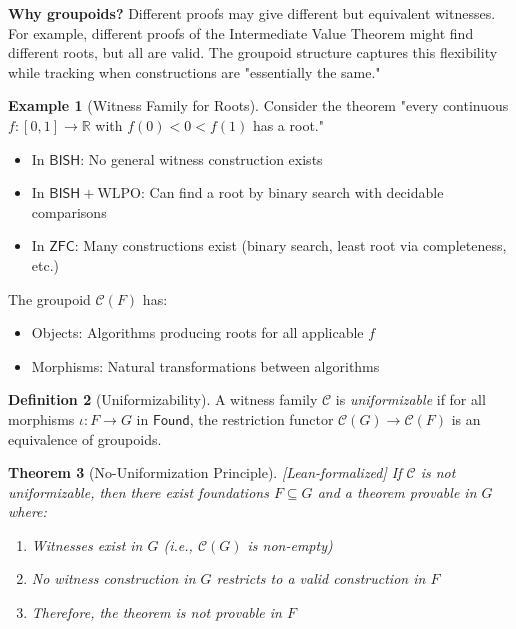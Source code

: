 \documentclass[11pt]{article}
\theoremstyle{plain}
\newtheorem{theorem}{Theorem}[section]
\theoremstyle{definition}
\newtheorem{definition}[theorem]{Definition}
\newtheorem{example}[theorem]{Example}
\newcommand{\R}{\mathbb{R}}
\newcommand{\WLPO}{\mathrm{WLPO}}
\newcommand{\BISH}{\mathsf{BISH}}
\newcommand{\ZFC}{\mathsf{ZFC}}
\newcommand{\Found}{\mathsf{Found}}
\newcommand{\leanok}{\textsf{\textcolor{green!70!black}{[Lean-formalized]}}}
\begin{document}
\begin{intuitionbox}
\textbf{Why groupoids?} Different proofs may give different but equivalent witnesses. For example, different proofs of the Intermediate Value Theorem might find different roots, but all are valid. The groupoid structure captures this flexibility while tracking when constructions are "essentially the same."
\end{intuitionbox}

\begin{example}[Witness Family for Roots]
Consider the theorem "every continuous $f: [0,1] \to \R$ with $f(0) < 0 < f(1)$ has a root."
\begin{itemize}
\item In $\BISH$: No general witness construction exists
\item In $\BISH + \WLPO$: Can find a root by binary search with decidable comparisons
\item In $\ZFC$: Many constructions exist (binary search, least root via completeness, etc.)
\end{itemize}
The groupoid $\mathcal{C}(F)$ has:
\begin{itemize}
\item Objects: Algorithms producing roots for all applicable $f$
\item Morphisms: Natural transformations between algorithms
\end{itemize}
\end{example}

\begin{definition}[Uniformizability]\label{def:uniformizable}
A witness family $\mathcal{C}$ is \emph{uniformizable} if for all morphisms $\iota: F \to G$ in $\Found$, the restriction functor $\mathcal{C}(G) \to \mathcal{C}(F)$ is an equivalence of groupoids.
\end{definition}

\begin{theorem}[No-Uniformization Principle]\label{thm:no-unif} \leanok
If $\mathcal{C}$ is not uniformizable, then there exist foundations $F \subseteq G$ and a theorem provable in $G$ where:
\begin{enumerate}
\item Witnesses exist in $G$ (i.e., $\mathcal{C}(G)$ is non-empty)
\item No witness construction in $G$ restricts to a valid construction in $F$
\item Therefore, the theorem is not provable in $F$
\end{enumerate}
\end{theorem}
\end{document}
